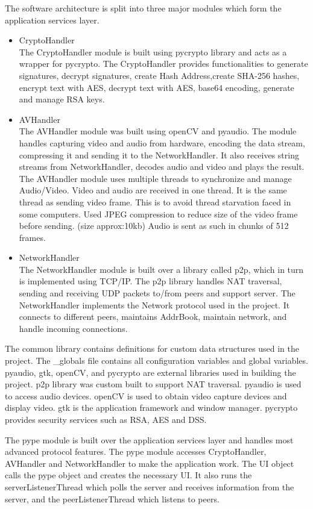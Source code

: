 \documentclass[a4paper,11pt]{article}
\begin{document}
The software architecture is split into three major modules which form the application services layer.
\begin{itemize}
\item CryptoHandler\\ The CryptoHandler module is built using pycrypto library and acts as a wrapper for pycrypto. The CryptoHandler provides functionalities to generate signatures, decrypt signatures, create Hash Address,create SHA-256 hashes, encrypt text with AES, decrypt text with AES, base64 encoding, generate and manage RSA keys.
\item AVHandler\\ The AVHandler module was built using openCV and pyaudio. The module handles capturing video and audio from hardware, encoding the data stream, compressing it and sending it to the NetworkHandler. It also receives string streams from NetworkHandler, decodes audio and video and plays the result. The AVHandler module uses multiple threads to synchronize and manage Audio/Video.
Video and audio are received in one thread. It is the same thread
as sending video frame. This is to avoid thread starvation faced in
some computers. Used JPEG compression to reduce size of the video frame before
sending. (size approx:10kb) Audio is sent as such in chunks of 512 frames.
\item NetworkHandler\\The NetworkHandler module is built over a library called p2p, which in turn is implemented using TCP/IP. The p2p library handles NAT traversal, sending and receiving UDP packets to/from peers and support server. The NetworkHandler implements the Network protocol used in the project. It connects to different peers, maintains AddrBook, maintain network, and handle incoming connections. 

\end{itemize}

The common library contains definitions for custom data structures used in the project. The \_globals file contains all configuration variables and global variables. pyaudio, gtk, openCV, and pycrypto are external libraries used in building the project. p2p library was custom built to support NAT 
traversal. pyaudio is used to access audio devices. openCV is used to obtain video capture devices and display video. gtk is the application framework and window manager. pycrypto provides security services such as RSA, AES and DSS.


The pype module is built over the application services layer and handles most advanced protocol features. The pype module accesses CryptoHandler, AVHandler and NetworkHandler to make the application work. The UI object calls the pype object and creates the necessary UI.
It also runs the serverListenerThread which polls the server and receives information from the server, and the peerListenerThread which listens to peers. 
\end{document}
